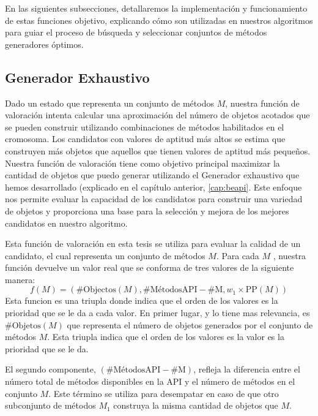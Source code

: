 En las siguientes subsecciones, detallaremos la implementación y funcionamiento de estas funciones objetivo, explicando cómo son utilizadas en nuestros algoritmos para guiar el proceso de búsqueda y seleccionar conjuntos de métodos generadores óptimos.

\subsection{Generador Exhaustivo}
\label{sec:fitnessGE}

Dado un estado que representa un conjunto de métodos $M$, nuestra función de valoración intenta calcular una aproximación del número de objetos acotados que se pueden construir utilizando combinaciones de métodos habilitados en el cromosoma. Los candidatos con valores de aptitud más altos se estima que construyen más objetos que aquellos que tienen valores de aptitud más pequeños.
Nuestra función de valoración tiene como objetivo principal maximizar la cantidad de objetos que puedo generar utilizando el Generador exhaustivo que hemos desarrollado (explicado en el capítulo anterior,  \ref{cap:beapi}. Este enfoque nos permite evaluar la capacidad de los candidatos para construir una variedad de objetos y proporciona una base para la selección y mejora de los mejores candidatos en nuestro algoritmo.

Esta función de valoración en esta tesis se utiliza para evaluar la calidad de un candidato, el cual representa un conjunto de métodos $M$. Para cada $M$ , nuestra función devuelve un valor real que se conforma de tres valores de la siguiente manera:
\begin{equation*}
f(M) = (\text{{\#Objectos}}(M), \text{{\#MétodosAPI}} - \text{{\#M}}, w_1 \times \text{{PP}}(M))
\end{equation*}
Esta funcion es una triupla donde indica que el orden de los valores es la prioridad que se le da a cada valor. 
En primer lugar, y lo tiene mas relevancia, es $\text{{\#Objetos}}(M)$ que representa el número de objetos generados por el conjunto de métodos $M$. Esta triupla indica que el orden de los valores es la  valor es la prioridad que se le da.

El segundo componente, $(\text{{\#MétodosAPI}} - \text{{\#M}})$, refleja la diferencia entre el número total de métodos disponibles en la API y el número de métodos en el conjunto $M$. Este término se utiliza para desempatar en caso de que otro subconjunto de métodos $M_1$ construya la misma cantidad de objetos que $M$.

